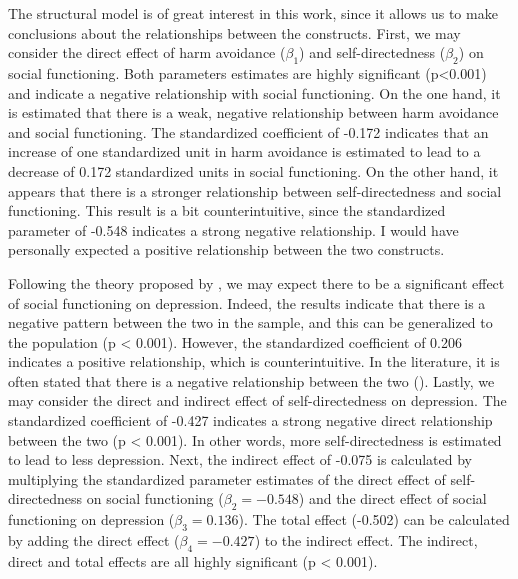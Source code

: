\documentclass[11pt]{article}
\begin{document}
The structural model is of great interest in this work, since it allows us
to make conclusions about the relationships between the constructs.
First, we may consider the direct effect of harm avoidance ($\beta_1$) and
self-directedness ($\beta_2$) on social functioning. Both parameters estimates
are highly significant (p<0.001) and indicate a negative relationship with
social functioning. On the one hand, it is estimated that there is a weak,
negative relationship between harm avoidance and social functioning. The
standardized coefficient of -0.172 indicates that an increase of one
standardized unit in harm avoidance is estimated to lead to a decrease of 0.172
standardized units in social functioning. On the other hand, it appears that
there is a stronger relationship between self-directedness and social
functioning. This result is a bit counterintuitive, since the standardized
parameter of -0.548 indicates a strong negative relationship. I would have
personally expected a positive relationship between the two constructs.

Following the theory proposed by \textcite{tse2011}, we may expect there to be
a significant effect of social functioning on depression. Indeed, the results
indicate that there is a negative pattern between the two in the sample, and
this can be generalized to the population (p < 0.001). However, the standardized
coefficient of 0.206 indicates a positive relationship, which is counterintuitive.
In the literature, it is often stated that there is a negative relationship
between the two (\cite{tse2011}).
Lastly, we may consider the direct and indirect effect of self-directedness on
depression. The standardized coefficient of -0.427 indicates a strong negative
direct relationship between the two (p < 0.001). In other words, more
self-directedness is estimated to lead to less depression.
Next, the indirect effect of -0.075 is calculated by multiplying the
standardized parameter estimates of the direct effect of self-directedness on
social functioning ($\beta_2 = -0.548$) and the direct effect of social
functioning on depression ($\beta_3 = 0.136$). 
The total effect (-0.502) can be calculated by adding the direct effect
($\beta_4 = -0.427$) to the indirect effect. The indirect, direct and total
effects are all highly significant (p < 0.001).
\end{document}
